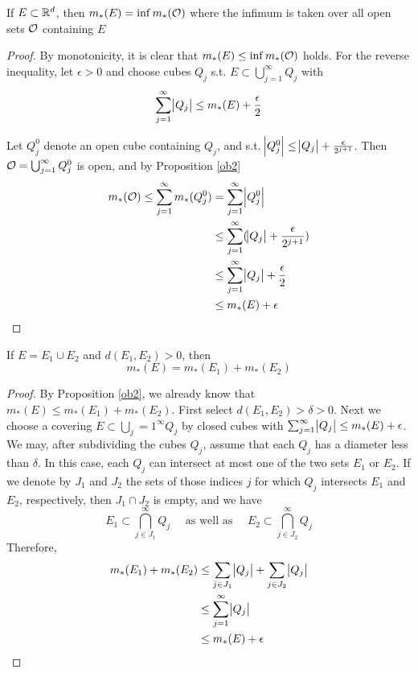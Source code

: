 \documentclass[11pt]{article}
\begin{document}
\begin{proposition}[]
\label{ob3}
If \(E\subset\mathbb{R}^d\), then \(m_*(E)=\inf m_*(\mathcal{O})\) where the infimum is taken
over all open sets \(\mathcal{O}\) containing \(E\)
\end{proposition}

\begin{proof}
By monotonicity, it is clear that \(m_*(E)\le\inf m_*(\mathcal{O})\) holds. For the
reverse inequality, let \(\epsilon>0\) and choose cubes \(Q_j\) s.t.
\(E\subset\bigcup_{j=1}^\infty Q_j\) with
\begin{equation*}
\displaystyle\sum_{j=1}^\infty\abs{Q_j}\le m_*(E)+\frac{\epsilon}{2}
\end{equation*}

Let \(Q_j^0\) denote an open cube containing \(Q_j\), and s.t. 
\(\abs{Q_j^0}\le\abs{Q_j}+\frac{\epsilon}{2^{j+1}}\). Then 
\(\mathcal{O}=\bigcup_{j=1}^\infty Q_j^0\) is open, and by Proposition \ref{ob2}
\begin{align*}
m_*(\mathcal{O})\le \displaystyle\sum_{j=1}^\infty m_*(Q_j^0)&=
\displaystyle\sum_{j=1}^\infty\abs{Q_j^0}\\
&\le \displaystyle\sum_{j=1}^\infty(\abs{Q_j}+\frac{\epsilon}{2^{j+1}})\\
&\le \displaystyle\sum_{j=1}^\infty\abs{Q_j}+\frac{\epsilon}{2}\\
&\le m_*(E)+\epsilon
\end{align*}
\end{proof}

\begin{proposition}[]
\label{ob4}
If \(E=E_1\cup E_2\) and \(d(E_1,E_2)>0\), then
\begin{equation*}
m_*(E)=m_*(E_1)+m_*(E_2)
\end{equation*}
\end{proposition}

\begin{proof}
By Proposition \ref{ob2}, we already know that \(m_*(E)\le m_*(E_1)+m_*(E_2)\).
First select \(d(E_1,E_2)>\delta>0\). Next we choose a covering
\(E\subset\bigcup_j=1^\infty Q_j\) by closed cubes with 
\(\sum_{j=1}^\infty\abs{Q_j}\le m_*(E)+\epsilon\). We may, after subdividing
the cubes \(Q_j\), assume that each \(Q_j\) has a diameter less than \(\delta\). In
this case, each \(Q_j\) can intersect at most one of the two sets \(E_1\) or
\(E_2\). If we denote by \(J_1\) and \(J_2\) the sets of those indices \(j\) for
which \(Q_j\) intersects \(E_1\) and \(E_2\), respectively, then \(J_1\cap J_2\) is
empty, and we have
\begin{equation*}
E_1\subset \displaystyle\bigcap_{j\in J_1}^\infty Q_j\quad
\text{ as well as }\quad
E_2\subset \displaystyle\bigcap_{j\in J_2}^\infty Q_j
\end{equation*}
Therefore, 
\begin{align*}
m_*(E_1)+m_*(E_2)&\le \displaystyle\sum_{j\in J_1}\abs{Q_j}+
\displaystyle\sum_{j\in J_2}\abs{Q_j}\\
&\le \displaystyle\sum_{j=1}^\infty\abs{Q_j}\\
&\le m_*(E)+\epsilon
\end{align*}
\end{proof}
\end{document}
